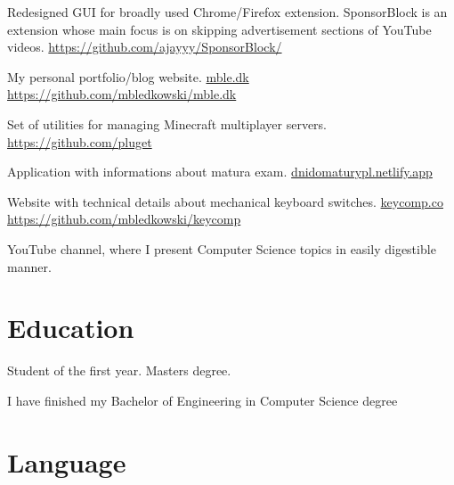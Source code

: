 \documentclass[11pt, a4paper, sans, colorlinks]{moderncv}
\begin{document}
{Redesigned GUI for broadly used Chrome/Firefox extension. SponsorBlock is an extension whose main focus is on skipping advertisement sections of YouTube videos. \href{https://github.com/ajayyy/SponsorBlock}{https://github.com/ajayyy/SponsorBlock/}}

{My personal portfolio/blog website. \href{https://mble.dk}{mble.dk} \href{https://github.com/mbledkowski/mble.dk}{https://github.com/mbledkowski/mble.dk}}

{Set of utilities for managing Minecraft multiplayer servers. \href{https://github.com/pluget}{https://github.com/pluget}}

{Application with informations about matura exam. \href{https://dnidomaturypl.netlify.app}{dnidomaturypl.netlify.app}}

{Website with technical details about mechanical keyboard switches. \href{https://keycomp.co}{keycomp.co} \href{https://github.com/mbledkowski/keycomp}{https://github.com/mbledkowski/keycomp}}

{YouTube channel, where I present Computer Science topics in easily digestible manner.}

\pagebreak

\section{Education}

{Student of the first year. Masters degree.}

{I have finished my Bachelor of Engineering in Computer Science degree}

\section{Language}
\end{document}
